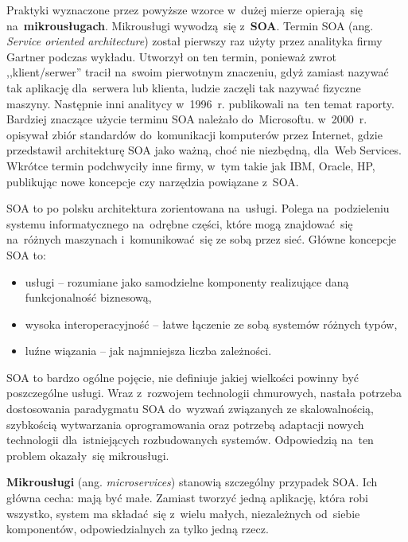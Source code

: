 \documentclass[12pt,a4paper,twoside,titlepage,openright]{book}
\begin{document}
Praktyki wyznaczone przez powyższe wzorce w~dużej mierze opierają~się na~\textbf{mikrousługach}. Mikrousługi wywodzą~się z~\textbf{SOA}. Termin SOA (ang. \textit{Service oriented architecture}) został pierwszy raz użyty przez analityka firmy Gartner podczas wykładu. Utworzył on ten termin, ponieważ zwrot ,,klient/serwer'' tracił na~swoim pierwotnym znaczeniu, gdyż zamiast nazywać tak aplikację dla~serwera lub klienta, ludzie zaczęli tak nazywać fizyczne maszyny. Następnie inni analitycy w~1996~r. publikowali na~ten temat raporty. Bardziej znaczące użycie terminu SOA należało do~Microsoftu. w~2000~r. opisywał zbiór standardów do~komunikacji komputerów przez Internet, gdzie przedstawił architekturę SOA jako ważną, choć nie niezbędną, dla~Web Services. Wkrótce termin podchwyciły inne firmy, w~tym  takie jak IBM, Oracle, HP, publikując nowe koncepcje czy narzędzia powiązane z~SOA. \cite{soaOreily}

SOA to po polsku architektura zorientowana na~usługi. Polega na~podzieleniu systemu informatycznego na~odrębne części, które mogą znajdować~się na~różnych maszynach i~komunikować~się ze sobą przez sieć. Główne koncepcje SOA to: 
\begin{itemize}
\item usługi -- rozumiane jako samodzielne komponenty realizujące daną funkcjonalność biznesową,
\item wysoka interoperacyjność -- łatwe łączenie ze sobą systemów różnych typów,
\item luźne wiązania -- jak najmniejsza liczba zależności. \cite{soaOreily}
\end{itemize}

SOA to bardzo ogólne pojęcie, nie definiuje jakiej wielkości powinny być poszczególne usługi. Wraz z~rozwojem technologii chmurowych, nastała potrzeba dostosowania paradygmatu SOA do~wyzwań związanych ze skalowalnością, szybkością wytwarzania oprogramowania oraz potrzebą adaptacji nowych technologii dla~istniejących rozbudowanych systemów. Odpowiedzią na~ten problem okazały~się mikrousługi.

\textbf{Mikrousługi} (ang. \textit{microservices}) stanowią szczególny przypadek SOA. Ich główna cecha: mają być małe. Zamiast tworzyć jedną aplikację, która robi wszystko, system ma składać~się z~wielu małych, niezależnych od~siebie komponentów, odpowiedzialnych za tylko jedną rzecz. \cite{microservicesPacktNetCore}
\end{document}
